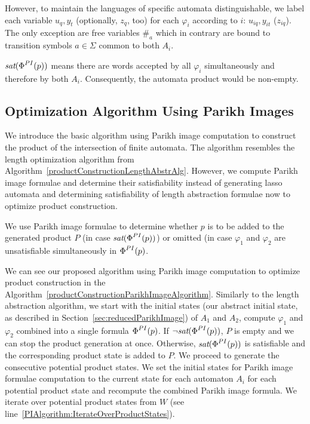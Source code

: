 However, to maintain the languages of specific automata distinguishable, we label each variable $u_q, y_t$ (optionally, $z_q$, too) for each $\varphi_i$ according to $i$: $u_{iq}, y_{it}$ ($z_{iq}$). The only exception are free variables $\#_a$ which in contrary are bound to transition symbols $a \in \Sigma$ common to both $A_i$.

$\emph{sat}(\emph{$\Phi$}^{PI}(p))$ means there are words accepted by all $\varphi_i$ simultaneously and therefore by both $A_i$. Consequently, the automata product would be non-empty.

\subsection{Optimization Algorithm Using Parikh Images}

We introduce the basic algorithm using Parikh image computation to construct the product of the intersection of finite automata. The algorithm resembles the length optimization algorithm from Algorithm~\ref{productConstructionLengthAbstrAlg}. However, we compute Parikh image formulae and determine their satisfiability instead of generating lasso automata and determining satisfiability of length abstraction formulae now to optimize product construction.

We use Parikh image formulae to determine whether $p$ is to be added to the generated product $P$ (in case $\emph{sat}(\emph{$\Phi$}^{PI}(p))$) or omitted (in case $\varphi_1$ and $\varphi_2$ are unsatisfiable simultaneously in $\emph{$\Phi$}^{PI}(p)$.

We can see our proposed algorithm using Parikh image computation to optimize product construction in the Algorithm~\ref{productConstructionParikhImageAlgorithm}. Similarly to the length abstraction algorithm, we start with the initial states (our abstract initial state, as described in Section~\ref{sec:reducedParikhImage}) of $A_1$ and $A_2$, compute $\varphi_1$ and $\varphi_2$ combined into a single formula $\emph{$\Phi$}^{PI}(p)$. If $\neg \emph{sat}(\emph{$\Phi$}^{PI}(p))$, $P$ is empty and we can stop the product generation at once. Otherwise, $\emph{sat}(\emph{$\Phi$}^{PI}(p))$ is satisfiable and the corresponding product state is added to $P$. We proceed to generate the consecutive potential product states. We set the initial states for Parikh image formulae computation to the current state for each automaton $A_i$ for each potential product state and recompute the combined Parikh image formula. We iterate over potential product states from $W$ (see line~\ref{PIAlgorithm:IterateOverProductStates}).


